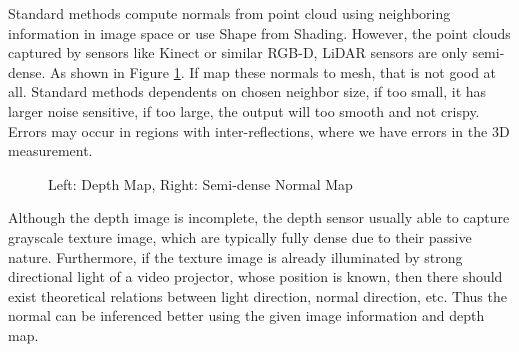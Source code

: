 

Standard methods compute normals from point cloud using neighboring information in image space or use Shape from Shading. However, the point clouds captured by sensors like Kinect or similar RGB-D, LiDAR sensors are only semi-dense. As shown in Figure \ref{fig:standard_normal_inference}. If map these normals to mesh, that is not good at all. Standard methods dependents on chosen neighbor size, if too small, it has larger noise sensitive, if too large, the output will too smooth and not crispy. Errors may occur in regions with inter-reflections, where we have errors in the 3D measurement. 

\begin{figure}[!h]
	\centering
\caption{Left: Depth Map, Right: Semi-dense Normal Map}
\label{fig:standard_normal_inference}
\end{figure}

Although the depth image is incomplete, the depth sensor usually able to capture grayscale texture image, which are typically fully dense due to their passive nature. Furthermore, if the texture image is already illuminated by strong directional light of a video projector, whose position is known, then there should exist theoretical relations between light direction, normal direction, etc. Thus the normal can be inferenced better using the given image information and depth map. 

